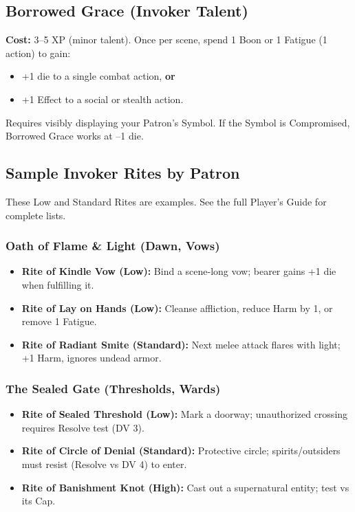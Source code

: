 \subsection{Borrowed Grace (Invoker Talent)}
\textbf{Cost:} 3–5 XP (minor talent). Once per scene, spend 1 Boon or 1 Fatigue (1 action) to gain:
\begin{itemize}
  \item +1 die to a single combat action, \textbf{or}
  \item +1 Effect to a social or stealth action.
\end{itemize}
Requires visibly displaying your Patron's Symbol. If the Symbol is Compromised, Borrowed Grace works at –1 die.

\subsection{Sample Invoker Rites by Patron}

These Low and Standard Rites are examples. See the full Player's Guide for complete lists.

\subsubsection{Oath of Flame \& Light (Dawn, Vows)}
\begin{itemize}
  \item \textbf{Rite of Kindle Vow (Low):} Bind a scene-long vow; bearer gains +1 die when fulfilling it.
  \item \textbf{Rite of Lay on Hands (Low):} Cleanse affliction, reduce Harm by 1, or remove 1 Fatigue.
  \item \textbf{Rite of Radiant Smite (Standard):} Next melee attack flares with light; +1 Harm, ignores undead armor.
\end{itemize}

\subsubsection{The Sealed Gate (Thresholds, Wards)}
\begin{itemize}
  \item \textbf{Rite of Sealed Threshold (Low):} Mark a doorway; unauthorized crossing requires Resolve test (DV 3).
  \item \textbf{Rite of Circle of Denial (Standard):} Protective circle; spirits/outsiders must resist (Resolve vs DV 4) to enter.
  \item \textbf{Rite of Banishment Knot (High):} Cast out a supernatural entity; test vs its Cap.
\end{itemize}

